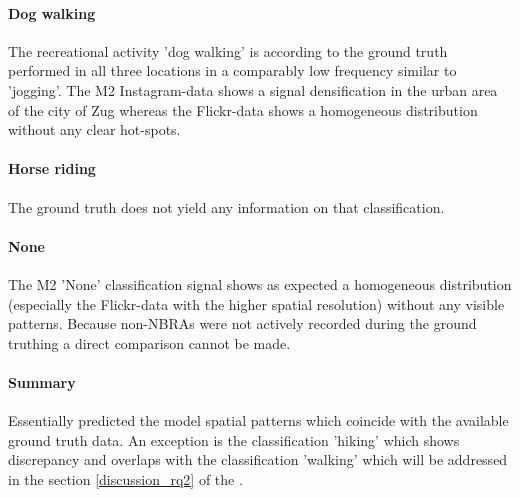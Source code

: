 \paragraph*{Dog walking}
The recreational activity 'dog walking' is according to the ground truth performed in all three locations in a comparably low frequency similar to 'jogging'. The M2 Instagram-data shows a signal densification in the urban area of the city of Zug whereas the Flickr-data shows a homogeneous distribution without any clear hot-spots.

\paragraph*{Horse riding}
The ground truth does not yield any information on that classification.

\paragraph*{None} The M2 'None' classification signal shows as expected a homogeneous distribution (especially the Flickr-data with the higher spatial resolution) without any visible patterns. Because non-NBRAs were not actively recorded during the ground truthing a direct comparison cannot be made.

\paragraph*{Summary}
Essentially predicted the model spatial patterns which coincide with the available ground truth data. An exception is the classification 'hiking' which shows discrepancy and overlaps with the classification 'walking' which will be addressed in the section \ref{discussion_rq2} of the .

